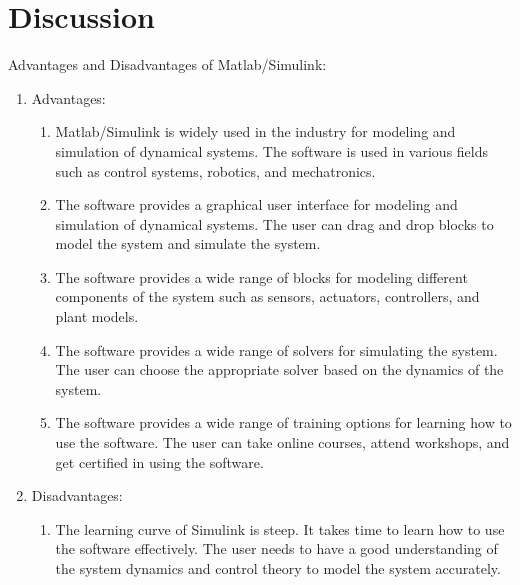 \documentclass{article}
\begin{document}
    \section{Discussion}
    Advantages and Disadvantages of Matlab/Simulink:
    \begin{enumerate}
        \item Advantages:
            \begin{enumerate}
                \item Matlab/Simulink is widely used in the industry for modeling
                    and simulation of dynamical systems. The software is used in
                    various fields such as control systems, robotics, and
                    mechatronics.

                \item The software provides a graphical user interface for modeling
                    and simulation of dynamical systems. The user can drag and
                    drop blocks to model the system and simulate the system.

                \item The software provides a wide range of blocks for modeling different
                    components of the system such as sensors, actuators, controllers,
                    and plant models.

                \item The software provides a wide range of solvers for simulating
                    the system. The user can choose the appropriate solver based
                    on the dynamics of the system.

                \item The software provides a wide range of training options for
                    learning how to use the software. The user can take online
                    courses, attend workshops, and get certified in using the
                    software.
            \end{enumerate}

        \item Disadvantages:
            \begin{enumerate}
                \item The learning curve of Simulink is steep. It takes time to
                    learn how to use the software effectively. The user needs to
                    have a good understanding of the system dynamics and control
                    theory to model the system accurately.


\end{enumerate}
\end{enumerate}
\end{document}
